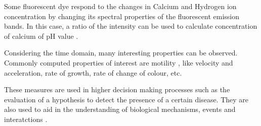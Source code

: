 \begin{definition}
	Some fluorescent dye respond to the changes in Calcium and Hydrogen ion concentration by changing its spectral properties of the fluorescent emission bands. In this case, a ratio of the intensity can be used to calculate concentration of calcium of pH value \citep{Dobrucki2013}.
\end{definition}

\begin{definition}
	Considering the time domain, many interesting properties can be observed.
	Commonly computed properties of interest are motility \citep{Sekar2003,Miller1869,Mathur2000}, like velocity and acceleration, rate of growth, rate of change of colour, etc.
\end{definition}

These measures are used in higher decision making processes such as the evaluation of a hypothesis to detect the presence of a certain disease. They are also used to aid in the understanding of biological mechanisms, events and interatctions \citep{Danek2012}.